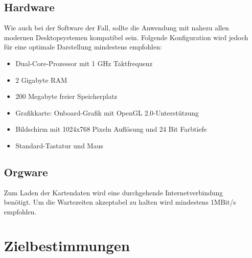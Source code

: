 \documentclass[10pt]{scrreprt}
\begin{document}
\section{Hardware}
Wie auch bei der Software der Fall, sollte die Anwendung mit nahezu allen modernen Desktopsystemen kompatibel sein. Folgende Konfiguration wird jedoch für eine optimale Darstellung mindestens empfohlen:
\begin{itemize}
\item Dual-Core-Prozessor mit 1 GHz Taktfrequenz
\item 2 Gigabyte RAM
\item 200 Megabyte freier Speicherplatz
\item Grafikkarte: Onboard-Grafik mit OpenGL 2.0-Unterstützung
\item Bildschirm mit 1024x768 Pixeln Auflösung und 24 Bit Farbtiefe
\item Standard-Tastatur und Maus
\end{itemize}



\section{Orgware}
Zum Laden der Kartendaten wird eine durchgehende Internetverbindung benötigt. Um die Wartezeiten akzeptabel zu halten wird mindestens 1MBit/s empfohlen.




\chapter{Zielbestimmungen}
\end{document}
